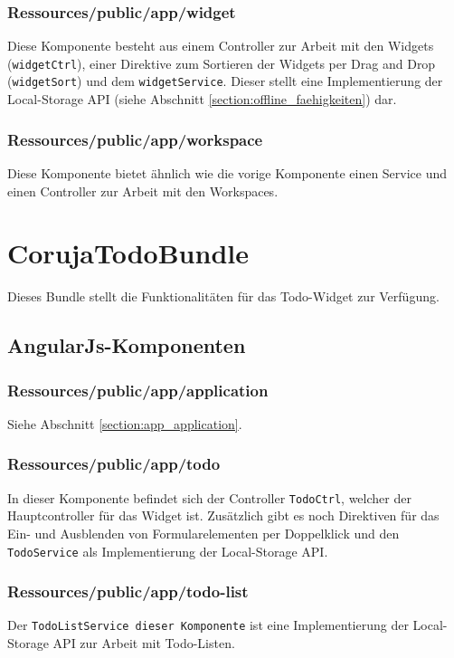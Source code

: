 \subsubsection*{Ressources/public/app/widget}
Diese Komponente besteht aus einem Controller zur Arbeit mit den Widgets (\texttt{widget\allowbreak Ctrl}), einer Direktive zum Sortieren der Widgets per Drag and Drop (\texttt{widget\allowbreak Sort}) und dem \texttt{widget\allowbreak Service}. Dieser stellt eine Implementierung der Local-Storage API (siehe Abschnitt \ref{section:offline_faehigkeiten}) dar.

\subsubsection*{Ressources/public/app/workspace}
Diese Komponente bietet ähnlich wie die vorige Komponente einen Service und einen Controller zur Arbeit mit den Workspaces.

\section{CorujaTodoBundle}
Dieses Bundle stellt die Funktionalitäten für das Todo-Widget zur Verfügung.

\subsection{AngularJs-Komponenten}

\subsubsection*{Ressources/public/app/application}
Siehe Abschnitt \ref{section:app_application}.

\subsubsection*{Ressources/public/app/todo}
In dieser Komponente befindet sich der Controller \texttt{TodoCtrl}, welcher der Hauptcontroller für das Widget ist. Zusätzlich gibt es noch Direktiven für das Ein- und Ausblenden von Formularelementen per Doppelklick und den \texttt{TodoService} als Implementierung der Local-Storage API.

\subsubsection*{Ressources/public/app/todo-list}
Der \texttt{TodoListService dieser Komponente} ist eine Implementierung der Local-Storage API zur Arbeit mit Todo-Listen.
